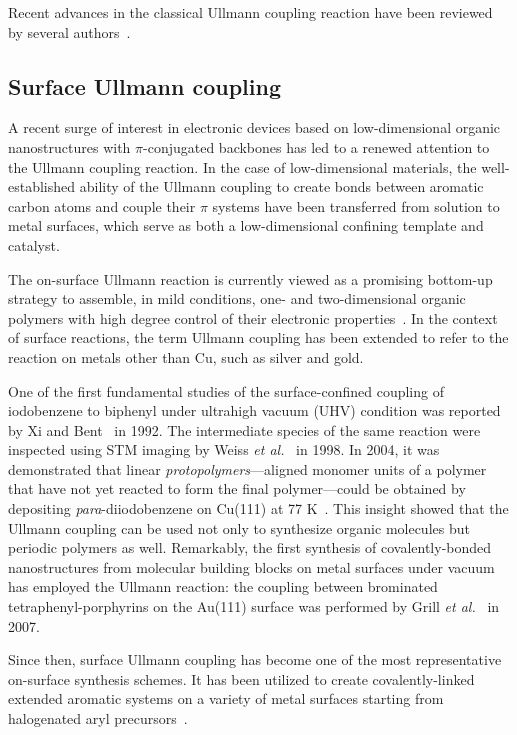 \documentclass[%
 reprint,
 amsmath,amssymb,
 aps,
prb,
]{revtex4-2}
\begin{document}
Recent advances in the classical Ullmann coupling reaction have been reviewed by several authors~\cite{ullmann_29,ullmann_30,ullmann_31,ullmann_32}.

\subsection{Surface Ullmann coupling}

A recent surge of interest in electronic devices based on low-dimensional organic nanostructures with $\pi$-conjugated backbones has led to a renewed attention to the Ullmann coupling reaction. 
In the case of low-dimensional materials, the well-established ability of the Ullmann coupling to create bonds between aromatic carbon atoms and couple their $\pi$ systems have been transferred from solution to metal surfaces, which serve as both a low-dimensional confining template and catalyst.

The on-surface Ullmann reaction is currently viewed as a promising bottom-up strategy to assemble, in mild conditions, one- and two-dimensional organic polymers with high degree control of their electronic properties~\cite{ullmann_33}. 
In the context of surface reactions, the term Ullmann coupling has been extended to refer to the reaction on metals other than Cu, such as silver and gold. 

One of the first fundamental studies of the surface-confined coupling of iodobenzene to biphenyl under ultrahigh vacuum (UHV) condition was reported by Xi and Bent~\cite{sur_sci01} in 1992.
%
The intermediate species of the same reaction were inspected using STM imaging by Weiss \textit{et al.}~\cite{langm01} in 1998. 
In 2004, it was demonstrated that linear \emph{protopolymers}---aligned monomer units of a polymer that have not yet reacted to form the final polymer---could be obtained by depositing \textit{para}-diiodobenzene on Cu(111) at 77 K~\cite{jacs01}. 
This insight showed that the Ullmann coupling can be used not only to synthesize organic molecules but periodic polymers as well.
Remarkably, the first synthesis of covalently-bonded nanostructures from molecular building blocks on metal surfaces under vacuum has employed the Ullmann reaction: the coupling between brominated tetraphenyl-porphyrins on the Au(111) surface was performed by Grill \textit{et al.}~\cite{Naturenano2007} in 2007.

Since then, surface Ullmann coupling has become one of the most representative on-surface synthesis schemes. It has been utilized to create covalently-linked extended aromatic systems on a variety of metal surfaces starting from halogenated aryl precursors~\cite{ullmann_33,ullmann_34, ullmann_42, ullmann_43, ullmann_45, ullmann_46, ullmann_47, ullmann_48}. 
\end{document}
